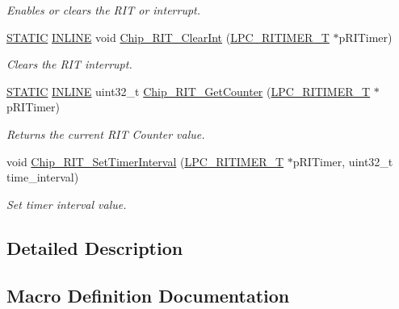 \begin{DoxyCompactItemize}
\begin{DoxyCompactList}\small\item\em Enables or clears the R\+IT or interrupt. \end{DoxyCompactList}\item 
\hyperlink{group___l_p_c___types___public___macros_ga10b2d890d871e1489bb02b7e70d9bdfb}{S\+T\+A\+T\+IC} \hyperlink{spifi__18xx__43xx_8h_a2eb6f9e0395b47b8d5e3eeae4fe0c116}{I\+N\+L\+I\+NE} void \hyperlink{group___r_i_t_i_m_e_r__18_x_x__43_x_x_ga16ba8104cee04723ddd751b99655f01d}{Chip\+\_\+\+R\+I\+T\+\_\+\+Clear\+Int} (\hyperlink{struct_l_p_c___r_i_t_i_m_e_r___t}{L\+P\+C\+\_\+\+R\+I\+T\+I\+M\+E\+R\+\_\+T} $\ast$p\+R\+I\+Timer)
\begin{DoxyCompactList}\small\item\em Clears the R\+IT interrupt. \end{DoxyCompactList}\item 
\hyperlink{group___l_p_c___types___public___macros_ga10b2d890d871e1489bb02b7e70d9bdfb}{S\+T\+A\+T\+IC} \hyperlink{spifi__18xx__43xx_8h_a2eb6f9e0395b47b8d5e3eeae4fe0c116}{I\+N\+L\+I\+NE} uint32\+\_\+t \hyperlink{group___r_i_t_i_m_e_r__18_x_x__43_x_x_ga8993e210c53f74ba84933ef5ef4b58ad}{Chip\+\_\+\+R\+I\+T\+\_\+\+Get\+Counter} (\hyperlink{struct_l_p_c___r_i_t_i_m_e_r___t}{L\+P\+C\+\_\+\+R\+I\+T\+I\+M\+E\+R\+\_\+T} $\ast$p\+R\+I\+Timer)
\begin{DoxyCompactList}\small\item\em Returns the current R\+IT Counter value. \end{DoxyCompactList}\item 
void \hyperlink{group___r_i_t_i_m_e_r__18_x_x__43_x_x_ga9473901c9e5ba4867c14597473cacf2b}{Chip\+\_\+\+R\+I\+T\+\_\+\+Set\+Timer\+Interval} (\hyperlink{struct_l_p_c___r_i_t_i_m_e_r___t}{L\+P\+C\+\_\+\+R\+I\+T\+I\+M\+E\+R\+\_\+T} $\ast$p\+R\+I\+Timer, uint32\+\_\+t time\+\_\+interval)
\begin{DoxyCompactList}\small\item\em Set timer interval value. \end{DoxyCompactList}\end{DoxyCompactItemize}


\subsection{Detailed Description}


\subsection{Macro Definition Documentation}
\mbox{\label{group___r_i_t_i_m_e_r__18_x_x__43_x_x_ga5b766561bf28441b64bc533325e43be0}} 

